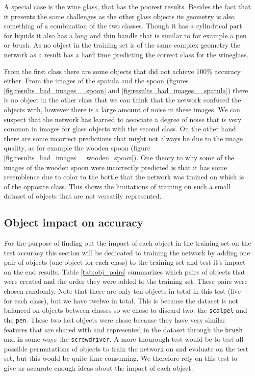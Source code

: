 A special case is the wine glass, that has the poorest results. Besides the fact that it presents the same challenges as the other glass objects its geometry is also something of a combination of the two classes. Though it has a cylindrical part for liquids it also has a long and thin handle that is similar to for example a pen or brush. As no object in the training set is of the same complex geometry the network as a result has a hard time predicting the correct class for the wineglass.

From the first class there are some objects that did not achieve 100\% accuracy either. From the images of the spatula and the spoon (figures \ref{fig:results_bad_images__spoon} and \ref{fig:results_bad_images__spatula}) there is no object in the other class that we can think that the network confused the objects with, however there is a large amount of noise in these images. We can suspect that the network has learned to associate a degree of noise that is very common in images for glass objects with the second class. On the other hand there are some incorrect predictions that might not always be due to the image quality, as for example the wooden spoon (figure \ref{fig:results_bad_images__wooden_spoon}). One theory to why some of the images of the wooden spoon were incorrectly predicted is that it has some resemblence due to color to the bottle that the network was trained on which is of the opposite class. This shows the limitations of training on such a small dataset of objects that are not versatily represented.


\subsection{Object impact on accuracy}

For the purpose of finding out the impact of each object in the training set on the test accuracy this section will be dedicated to training the network by adding one pair of objects (one object for each class) to the training set and test it's impact on the end results. Table \ref{tab:obj_pairs} summarizes which pairs of objects that were created and the order they were added to the training set. These pairs were chosen randomly. Note that there are only ten objects in total in this test (five for each class), but we have twelwe in total. This is because the dataset is not balanced on objects between classes so we chose to discard two: the \texttt{scalpel} and the \texttt{pen}. These two last objects were chose because they have very similar features that are shared with and represented in the dataset through the \texttt{brush} and in some ways the \texttt{screwdriver}. A more thourough test would be to test all possible permutations of objects to train the network on and evaluate on the test set, but this would be quite time consuming. We therefore rely on this test to give us accurate enough ideas about the impact of each object.


